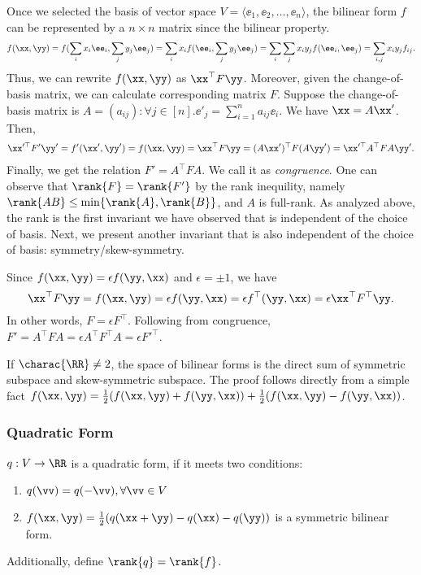 \documentclass[12pt]{article}
\begin{document}
Once we selected the basis of vector space
$V = \langle \ee_1, \ee_2, \dots, \ee_n
\rangle$, the bilinear form $f$ can be
represented by a $n \times n$ matrix since the
bilinear property.
$$
f(\xx, \yy) =
f(\sum_i x_i \ee_i, \sum_j y_j \ee_j) =
\sum_i x_if(\ee_i, \sum_j y_j \ee_j) =
\sum_i \sum_j x_iy_j f(\ee_i, \ee_j) =
\sum_{i,j} x_iy_jf_{ij}.
$$
Thus, we can rewrite $f(\xx,\yy)$ as $\xx^\top
F \yy$. Moreover, given the change-of-basis
matrix, we can calculate corresponding matrix
$F$. Suppose the change-of-basis matrix is
$A = (a_{ij}):
\forall j \in [n].
\ee'_j = \sum_{i=1}^n a_{ij}\ee_i$.
We have $\xx = A \xx'$. Then,
\begin{align*}
  \xx'^\top F' \yy' = f'(\xx', \yy') =
  f(\xx,\yy) = \xx^\top F \yy =
  (A \xx')^\top F (A \yy') =
  \xx'^\top A^\top F A \yy'.
\end{align*}
Finally, we get the relation $F' = A^\top F A$.
We call it as \emph{congruence}. One can
observe that $\rank{F} = \rank{F'}$ by the
rank inequility, namely $\rank{AB} \leq
\min\{\rank{A}, \rank{B}\}$, and $A$ is
full-rank. As analyzed above, the rank is the
first invariant we have observed that is
independent of the choice of basis. Next, we
present another invariant that is also
independent of the choice of basis:
symmetry/skew-symmetry.

Since $f(\xx, \yy) = \epsilon f(\yy, \xx)$ and
$\epsilon = \pm 1$, we have
$$
\xx^\top F \yy = f(\xx, \yy) =
\epsilon f(\yy,\xx) = \epsilon f^\top(\yy,\xx)
= \epsilon \xx^\top F^\top \yy.
$$
In other words, $F = \epsilon F^\top$.
Following from congruence, $F' = A^\top F A
= \epsilon A^\top F^\top A = \epsilon F'^\top$.

If $\charac{\RR} \neq 2$, the space of
bilinear forms is the direct sum of symmetric
subspace and skew-symmetric subspace. The
proof follows directly from a simple fact
$f(\xx, \yy) =
\frac{1}{2}(f(\xx, \yy) + f(\yy, \xx)) +
\frac{1}{2}(f(\xx, \yy) - f(\yy, \xx))$.

\subsubsection{Quadratic Form}

\begin{Define}
  $q: V \rightarrow \RR$ is a quadratic form,
  if it meets two conditions:
  \begin{enumerate}
  \item $q(\vv) = q(- \vv),
    \forall \vv \in V$
  \item $f(\xx, \yy) =
    \frac{1}{2}(q(\xx + \yy) - q(\xx) -
    q(\yy))$ is a symmetric bilinear form.
  \end{enumerate}
  Additionally, define $\rank{q} = \rank{f}$.
\end{Define}
\end{document}
